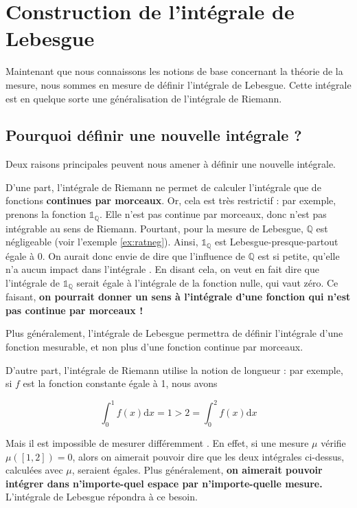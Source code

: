 \documentclass[../integ-proba.tex]{subfiles}
\begin{document}
  \chapter{Construction de l'intégrale de Lebesgue}

  Maintenant que nous connaissons les notions de base concernant la théorie de la mesure, nous sommes en mesure de définir l'intégrale de Lebesgue.
  Cette intégrale est en quelque sorte une généralisation de l'intégrale de Riemann.

  \section{Pourquoi définir une nouvelle intégrale ?}

  Deux raisons principales peuvent nous amener à définir une nouvelle intégrale.

  D'une part, l'intégrale de Riemann ne permet de calculer l'intégrale que de fonctions \textbf{continues par morceaux}.
  Or, cela est très restrictif : par exemple, prenons la fonction $\mathds{1}_{\mathbb{Q}}$.
  Elle n'est pas continue par morceaux, donc n'est pas intégrable au sens de Riemann.
  Pourtant, pour la mesure de Lebesgue, $\mathbb{Q}$ est négligeable (voir l'exemple \ref{ex:ratneg}).
  Ainsi, $\mathds{1}_{\mathbb{Q}}$ est Lebesgue-presque-partout égale à $0$.
  On aurait donc envie de dire que \og l'influence de $\mathbb{Q}$ est si petite, qu'elle n'a aucun impact dans l'intégrale \fg.
  En disant cela, on veut en fait dire que l'intégrale de $\mathds{1}_{\mathbb{Q}}$ serait égale à l'intégrale de la fonction nulle, qui vaut zéro.
  Ce faisant, \textbf{on pourrait donner un sens à l'intégrale d'une fonction qui n'est pas continue par morceaux !}

  Plus généralement, l'intégrale de Lebesgue permettra de définir l'intégrale d'une fonction mesurable, et non plus d'une fonction continue par morceaux.

  D'autre part, l'intégrale de Riemann utilise la notion de longueur :
  par exemple, si $f$ est la fonction constante égale à 1, nous avons

  $$
  \int_0^1f(x)\text{d}x = 1 > 2 = \int_0^2f(x)\text{d}x
  $$

  Mais il est impossible de \og mesurer différemment \fg.
  En effet, si une mesure $\mu$ vérifie $\mu\left(\left[1,2\right]\right)=0$, alors on aimerait pouvoir dire que les deux intégrales ci-dessus, calculées avec $\mu$, seraient égales.
  Plus généralement, \textbf{on aimerait pouvoir intégrer dans n'importe-quel espace par n'importe-quelle mesure.}
  L'intégrale de Lebesgue répondra à ce besoin.
\end{document}
